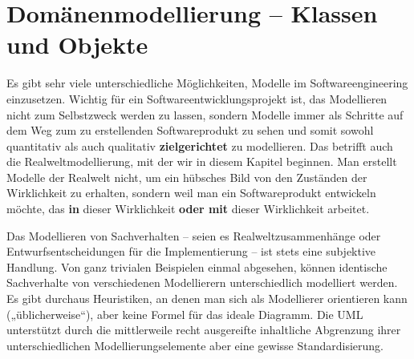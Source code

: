 \cleardoublepage
\chapter{Domänenmodellierung -- Klassen und Objekte}
\label{sec:Kap-4}

Es gibt sehr viele unterschiedliche Möglichkeiten, Modelle im Softwareengineering einzusetzen. Wichtig für ein Softwareentwicklungsprojekt ist, das Modellieren nicht zum Selbstzweck werden zu lassen, sondern Modelle immer als Schritte auf dem Weg zum zu erstellenden Softwareprodukt zu sehen und somit sowohl quantitativ als auch qualitativ \textbf{zielgerichtet} zu modellieren. Das betrifft auch die Realweltmodellierung, mit der wir in diesem Kapitel beginnen. Man erstellt Modelle der Realwelt nicht, um ein hübsches Bild von den Zuständen der Wirklichkeit zu erhalten, sondern weil man ein Softwareprodukt entwickeln möchte, das \textbf{in} dieser Wirklichkeit \textbf{oder mit} dieser Wirklichkeit arbeitet.

Das Modellieren
von Sachverhalten – seien es Realweltzusammenhänge oder Entwurfsentscheidungen für die Implementierung – ist stets eine subjektive Handlung. Von ganz trivialen Beispielen einmal abgesehen, können identische Sachverhalte von verschiedenen Modellierern unterschiedlich modelliert werden. Es gibt durchaus Heuristiken, an denen man sich als Modellierer orientieren kann („üblicherweise“), aber keine Formel für das ideale Diagramm. Die UML unterstützt durch die mittlerweile recht ausgereifte inhaltliche Abgrenzung ihrer unterschiedlichen Modellierungs\-elemente aber eine gewisse Standardisierung.


\clearpage


\clearpage


\clearpage


\clearpage
